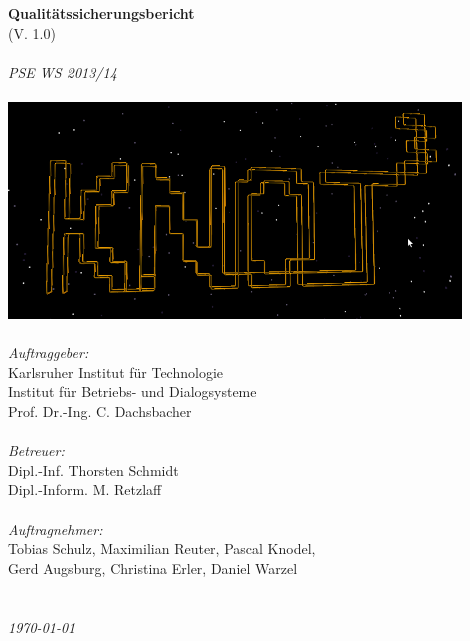 \begin{center} 

        \textbf{\Huge{Qualitätssicherungsbericht}} \\
        \Large{(V. 1.0)}\\~\\
        \emph{\Large{PSE WS 2013/14}}\\~\\
        \includegraphics[width=0.9\textwidth]{Knot} \\~\\
        \emph{\Large{Auftraggeber:}}\\
        \Large{Karlsruher Institut für Technologie}\\
        \Large{Institut für Betriebs- und Dialogsysteme}\\
        \Large{Prof. Dr.-Ing. C. Dachsbacher}\\~\\
        \emph{\Large{Betreuer:}}\\
        \Large{Dipl.-Inf. Thorsten Schmidt}\\
        \Large{Dipl.-Inform. M. Retzlaff}\\~\\
        \emph{\Large{Auftragnehmer:}}\\
        \Large{Tobias Schulz, Maximilian Reuter, Pascal                               Knodel,}\\
	 	\Large{Gerd Augsburg, Christina Erler, Daniel Warzel}~\\~\\~\\
        \emph{\Large{\today}}

\end{center}